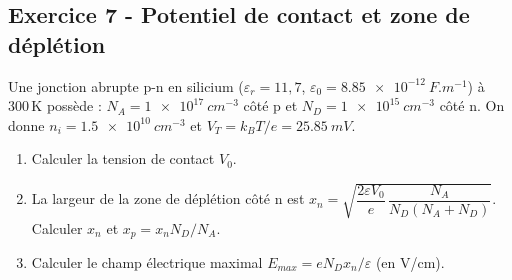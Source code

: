 \documentclass[12pt,a4paper]{article}
\begin{document}
\subsection*{Exercice 7 - Potentiel de contact et zone de déplétion \niveau{\moyen}}

\begin{boiteexercice}
Une jonction abrupte p-n en silicium ($\varepsilon_r = 11{,}7$, $\varepsilon_0 = \qty{8.85e-12}{F.m^{-1}}$) à 300\,K possède : $N_A = \qty{1e17}{cm^{-3}}$ côté p et $N_D = \qty{1e15}{cm^{-3}}$ côté n. On donne $n_i = \qty{1.5e10}{cm^{-3}}$ et $V_T = k_BT/e = \qty{25.85}{mV}$.
\begin{enumerate}
  \item Calculer la tension de contact $V_0$.
  \item La largeur de la zone de déplétion côté n est $x_n = \sqrt{\dfrac{2\varepsilon V_0}{e}\,\dfrac{N_A}{N_D(N_A+N_D)}}$. Calculer $x_n$ et $x_p = x_n N_D/N_A$.
  \item Calculer le champ électrique maximal $E_{max} = eN_Dx_n/\varepsilon$ (en V/cm).
\end{enumerate}
\end{boiteexercice}
\end{document}
